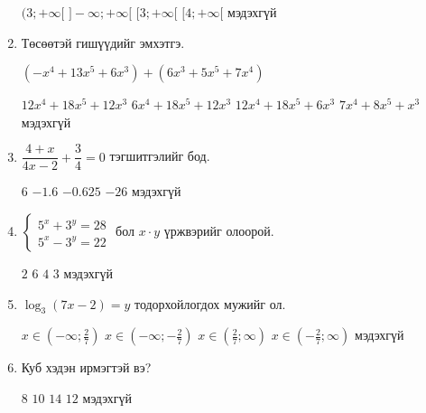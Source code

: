 \documentclass{exam}
\begin{document}
\begin{enumerate}
\begin{oneparchoices}
            \choice $(3; +\infty[$
            \choice $]-\infty; +\infty[$
            \choice $[ 3; +\infty[$
            \choice $[ 4; +\infty[$
            \choice мэдэхгүй
        \end{oneparchoices}

\item Төсөөтэй гишүүдийг эмхэтгэ. 

$(-x^4+13x^5+6x^3)+(6x^3+5x^5+7x^4)$

\begin{oneparchoices}
 \choice $12x^4+18x^5+12x^3$
 \choice $6x^4+18x^5+12x^3$ 
 \choice $12x^4+18x^5+6x^3$   
 \choice $7x^4+8x^5+x^3$
 \choice мэдэхгүй
\end{oneparchoices}

\item $\dfrac{4+x}{4x-2}+\dfrac{3}{4}=0$ тэгшитгэлийг бод.
    
\begin{oneparchoices}
 \choice $6$
 \choice $-1.6$
 \choice $-0.625$
 \choice $-26$
 \choice мэдэхгүй
\end{oneparchoices}

\item $\begin{cases}
    5^x+3^y=28\\
    5^x-3^y=22
    \end{cases}$ бол $x\cdot y$ үржвэрийг олоорой. 
    
        \begin{oneparchoices}
            \choice $2$
            \choice $6$
            \choice $4$
            \choice $3$
            \choice мэдэхгүй
        \end{oneparchoices}
        
\item $\log_3(7x-2)=y$ тодорхойлогдох мужийг ол. 

\begin{oneparchoices}
 \choice $x\in (-\infty;\frac{2}{7})$
 \choice $x\in (-\infty;-\frac{2}{7})$
 \choice $x\in (\frac{2}{7};\infty)$  
 \choice $x\in (-\frac{2}{7};\infty)$
 \choice мэдэхгүй
\end{oneparchoices}

\item Куб хэдэн ирмэгтэй вэ?
    
        \begin{oneparchoices}
            \choice $8$
            \choice $10$
            \choice $14$
            \choice $12$
            \choice мэдэхгүй
        \end{oneparchoices}


\end{enumerate}
\end{document}
